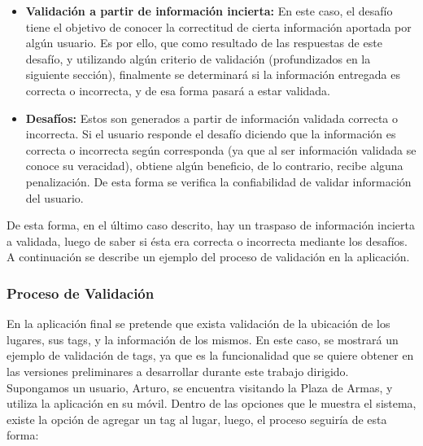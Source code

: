 \documentclass[10pt,letterpaper]{article}
\begin{document}
\begin{itemize}
  \item \textbf{Validación a partir de información incierta:} En este caso, el desafío tiene el objetivo de conocer la correctitud de cierta información aportada por algún usuario. Es por ello, que como resultado de las respuestas de este desafío, y utilizando algún criterio de validación (profundizados en la siguiente sección), finalmente se determinará si la información entregada es correcta o incorrecta, y de esa forma pasará a estar validada.\\
 \item \textbf{Desafíos:} Estos son generados a partir de información validada correcta o incorrecta. Si el usuario responde el desafío diciendo que la información es correcta o incorrecta según corresponda (ya que al ser información validada se conoce su veracidad), obtiene algún beneficio, de lo contrario, recibe alguna penalización. De esta forma se verifica la confiabilidad de validar información del usuario.
\end{itemize}

De esta forma, en el último caso descrito, hay un traspaso de información incierta a validada, luego de saber si ésta era correcta o incorrecta mediante los desafíos.\\

A continuación se describe un ejemplo del proceso de validación en la aplicación.

\subsubsection{Proceso de Validación}

En la aplicación final se pretende que exista validación de la ubicación de los lugares, sus tags, y la información de los mismos. En este caso, se mostrará un ejemplo de validación de tags, ya que es la funcionalidad que se quiere obtener en las versiones preliminares a desarrollar durante este trabajo dirigido.\\

Supongamos un usuario, Arturo, se encuentra visitando la Plaza de Armas, y utiliza la aplicación en su móvil. Dentro de las opciones que le muestra el sistema, existe la opción de agregar un tag al lugar, luego, el proceso seguiría de esta forma:\\
\end{document}
